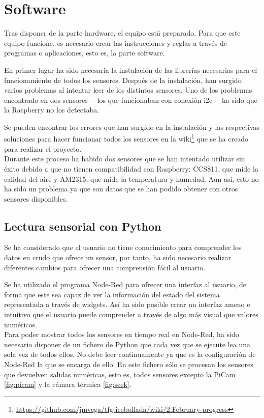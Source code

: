 \section{Software}
Tras disponer de la parte hardware, el equipo está preparado. Para que este equipo funcione, es necesario crear las instrucciones y reglas a través de programas o aplicaciones, esto es, la parte software.

En primer lugar ha sido necesaria la instalación de las librerías necesarias para el funcionamiento de todos los sensores. Después de la instalación, han surgido varios problemas al intentar leer de los distintos sensores. Uno de los problemas encontrado en dos sensores ---los que funcionaban con conexión i2c--- ha sido que la Raspberry no los detectaba.

Se pueden encontrar los errores que han surgido en la instalación y las respectivas soluciones para hacer funcionar todos los sensores en la wiki\footnote{\url{https://github.com/jmvega/tfg-icebollada/wiki/2.February-progress}} que se ha creado para realizar el proyecto.\\

Durante este proceso ha habido dos sensores que se han intentado utilizar sin éxito debido a que no tienen compatibilidad con Raspberry: CCS811, que mide la calidad del aire y AM2315, que mide la temperatura y humedad. Aun así, esto no ha sido un problema ya que son datos que se han podido obtener con otros sensores disponibles.\\

\subsection{Lectura sensorial con Python}
Se ha considerado que el usuario no tiene conocimiento para comprender los datos en crudo que ofrece un sensor, por tanto, ha sido necesario realizar diferentes cambios para ofrecer una comprensión fácil al usuario.

Se ha utilizado el programa Node-Red para ofrecer una interfaz al usuario, de forma que este sea capaz de ver la información del estado del sistema representada a través de widgets. Así ha sido posible crear un interfaz ameno e intuitivo que el usuario puede comprender a través de algo más visual que valores numéricos.\\

Para poder mostrar todos los sensores en tiempo real en Node-Red, ha sido necesario disponer de un fichero de Python que  cada vez que se ejecute lea una sola vez de todos ellos. No debe leer continuamente ya que es la configuración de Node-Red la que se encarga de ello. En este fichero sólo se procesan los sensores que devuelven salidas numéricas, esto es, todos sensores excepto la PiCam \ref{fig:picam} y la cámara térmica \ref{fig:seek}. 

